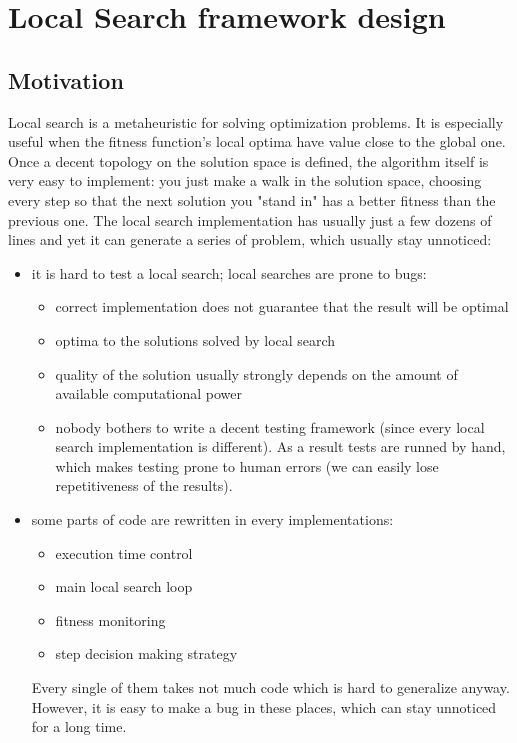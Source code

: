 \chapter{Local Search framework design}


\section{Motivation}

Local search \nocite{lswiki}
is a metaheuristic for solving optimization problems.
It is especially useful when the fitness function's local optima have value close to the global one.
Once a decent topology on the solution space is defined, the algorithm itself is very easy to implement:
you just make a walk in the solution space, choosing every step so that the next solution you "stand in" has
a better fitness than the previous one. The local search implementation has usually just a few dozens of lines and
yet it can generate a series of problem, which usually stay unnoticed:
\begin{itemize}
\item it is hard to test a local search; local searches are prone to bugs:
	\begin{itemize}
	\item correct implementation does not guarantee that the result will be optimal
	\item optima to the solutions solved by local search
	\item quality of the solution usually strongly depends on the amount of available computational power
	\item nobody bothers to write a decent testing framework (since every local search implementation is different).
		As a result tests are runned by hand, which makes testing prone to human errors (we can easily lose repetitiveness of the results).
	\end{itemize}
\item some parts of code are rewritten in every implementations:
	\begin{itemize}
	\item execution time control
	\item main local search loop
	\item fitness monitoring
	\item step decision making strategy
	\end{itemize}
	Every single of them takes not much code which is hard to generalize anyway.
	However, it is easy to make a bug in these places, which can stay unnoticed for a long time.
\end{itemize}

